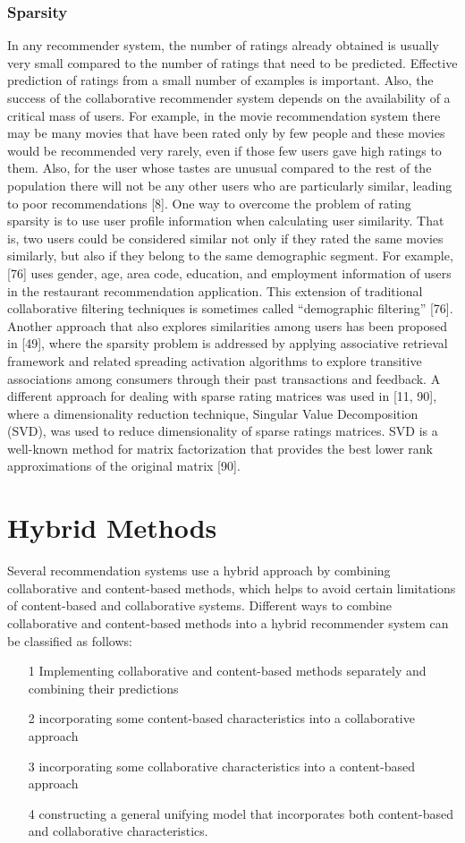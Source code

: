 \subsubsection{Sparsity}
In any recommender system, the number of ratings already obtained is usually very small compared to the number of ratings that need to be predicted. Effective prediction of ratings from a small number of examples is important. Also, the success of the collaborative recommender system depends on the availability of a critical mass of users. For example, in the movie recommendation system there may be many movies that have been rated only by few people and these movies would be recommended very rarely, even if those few users gave high ratings to them. Also, for the user whose tastes are unusual compared to the rest of the population there will not be any other users who are particularly similar, leading to poor recommendations [8]. One way to overcome the problem of rating sparsity is to use user profile information when calculating user similarity. That is, two users could be considered similar not only if they rated the same movies similarly, but also if they belong to the same demographic segment. For example, [76] uses gender, age, area code, education, and employment information of users in the restaurant recommendation application. This extension of traditional collaborative filtering techniques is sometimes called “demographic filtering” [76]. Another approach that also explores similarities among users has been proposed in [49], where the sparsity problem is addressed by applying associative retrieval framework and related spreading activation algorithms to explore transitive associations among consumers through their past transactions and feedback. A different approach for dealing with sparse rating matrices was used in [11, 90], where a dimensionality reduction technique, Singular Value Decomposition (SVD), was used to reduce dimensionality of sparse ratings matrices. SVD is a well-known method for matrix factorization that provides the best lower rank approximations of the original matrix [90].

\section{Hybrid Methods}
Several recommendation systems use a hybrid approach by combining collaborative and content-based methods, which helps to avoid certain limitations of content-based and collaborative systems. Different ways to combine collaborative and content-based methods into a hybrid recommender system can be classified as follows:
\begin{itemize}
\item [1] Implementing collaborative and content-based methods separately and combining their predictions
\item [2] incorporating some content-based characteristics into a collaborative approach
\item [3] incorporating some collaborative characteristics into a content-based approach
\item [4] constructing a general unifying model that incorporates both content-based and collaborative characteristics.
\end{itemize}

